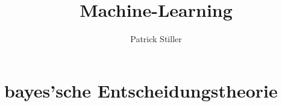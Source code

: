 \documentclass[]{article}
\author{Patrick Stiller} %
\title{Machine-Learning}
\begin{document}
\maketitle

\section{bayes'sche Entscheidungstheorie}

\end{document}
